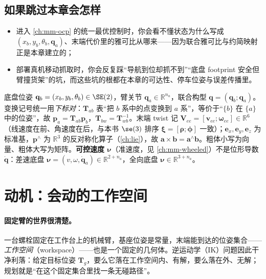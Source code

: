 \subsection*{如果跳过本章会怎样}
\begin{itemize}
  \item 进入 \cref{ch:mm-ocp} 的统一最优控制时，你会看不懂状态为什么写成 $(x_b,y_b,\theta_b,\mathbf{q}_a)$、末端代价里的雅可比从哪来——因为联合雅可比与约简映射正是本章建立的；
  \item 部署真机移动抓取时，你会反复踩“导航到位却抓不到”“底盘 footprint 安全但臂撞货架”的坑，而这些坑的根都在本章的可达性、停车位姿与误差传播里。
\end{itemize}

\begin{note}[本章记号与约定]\label{note:mmk-notation}
底盘位姿 $\mathbf{q}_b=(x_b,y_b,\theta_b)\in\SE(2)$，臂关节 $\mathbf{q}_a\in\mathbb{R}^{n_a}$，联合构型 $\mathbf{q}=(\mathbf{q}_b;\mathbf{q}_a)$。变换记号统一用\emph{下标对}：$\mathbf{T}_{ab}$ 表“把 $b$ 系中的点变换到 $a$ 系”，等价于“$\{b\}$ 在 $\{a\}$ 中的位姿”，故 $\mathbf{p}_a=\mathbf{T}_{ab}\mathbf{p}_b$，$\mathbf{T}_{bw}=\mathbf{T}_{wb}^{-1}$。末端 twist 记 $\mathbf{V}_{ee}=[\mathbf{v}_{ee};\boldsymbol{\omega}_{ee}]\in\mathbb{R}^6$（线速度在前、角速度在后，与本书 $\se(3)$ 排序 $\boldsymbol{\xi}=[\boldsymbol{\rho};\boldsymbol{\phi}]$ 一致）；$\mathbf{e}_x,\mathbf{e}_y,\mathbf{e}_z$ 为标准基，$\mathbf{p}^\wedge$ 为 $\mathbb{R}^3$ 的反对称化算子（\cref{ch:lie}），故 $\mathbf{a}\times\mathbf{b}=\mathbf{a}^\wedge\mathbf{b}$。粗体小写为向量、粗体大写为矩阵。\textbf{可控速度 $\boldsymbol{\nu}$}（准速度，见 \cref{ch:mm-wheeled}）不是位形导数 $\dot{\mathbf{q}}$：差速底盘 $\boldsymbol{\nu}=(v,\omega,\dot{\mathbf{q}}_a)\in\mathbb{R}^{2+n_a}$，全向底盘 $\boldsymbol{\nu}\in\mathbb{R}^{3+n_a}$。
\end{note}

\section{动机：会动的工作空间}
\label{sec:mmk-motivation}

\paragraph{固定臂的世界很清楚。}
一台螺栓固定在工作台上的机械臂，基座位姿是常量，末端能到达的位姿集合——\emph{工作空间}（workspace）——也是一个固定的几何体。逆运动学（IK）问题因此干净利落：给定目标位姿 $\mathbf{T}_g$，要么它落在工作空间内、有解，要么落在外、无解；规划就是“在这个固定集合里找一条无碰路径”。


